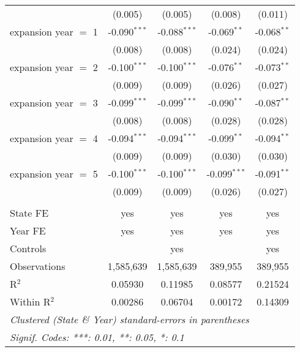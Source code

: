 \documentclass[
]{article}
\let\origtable\table
\let\endorigtable\endtable
\renewenvironment{table}[1][ht]{
      \expandafter\origtable\expandafter[H]
    }{
      \endorigtable
    }
\begin{document}
\begin{table}[htbp]
\begin{tabular}{lcccc}
                            & (0.005)        & (0.005)                & (0.008)        & (0.011)\\   
      expansion year $=$ 1  & -0.090$^{***}$ & -0.088$^{***}$         & -0.069$^{**}$  & -0.068$^{**}$\\   
                            & (0.008)        & (0.008)                & (0.024)        & (0.024)\\   
      expansion year $=$ 2  & -0.100$^{***}$ & -0.100$^{***}$         & -0.076$^{**}$  & -0.073$^{**}$\\   
                            & (0.009)        & (0.009)                & (0.026)        & (0.027)\\   
      expansion year $=$ 3  & -0.099$^{***}$ & -0.099$^{***}$         & -0.090$^{**}$  & -0.087$^{**}$\\   
                            & (0.008)        & (0.008)                & (0.028)        & (0.028)\\   
      expansion year $=$ 4  & -0.094$^{***}$ & -0.094$^{***}$         & -0.099$^{**}$  & -0.094$^{**}$\\   
                            & (0.009)        & (0.009)                & (0.030)        & (0.030)\\   
      expansion year $=$ 5  & -0.100$^{***}$ & -0.100$^{***}$         & -0.099$^{***}$ & -0.091$^{**}$\\   
                            & (0.009)        & (0.009)                & (0.026)        & (0.027)\\   
       \\
      State FE              & yes            & yes                    & yes            & yes\\  
      Year FE               & yes            & yes                    & yes            & yes\\  
      Controls              &                & yes                    &                & yes\\  
      Observations          & 1,585,639      & 1,585,639              & 389,955        & 389,955\\  
      R$^2$                 & 0.05930        & 0.11985                & 0.08577        & 0.21524\\  
      Within R$^2$          & 0.00286        & 0.06704                & 0.00172        & 0.14309\\  
      \midrule \midrule
      \multicolumn{5}{l}{\emph{Clustered (State \& Year) standard-errors in parentheses}}\\
      \multicolumn{5}{l}{\emph{Signif. Codes: ***: 0.01, **: 0.05, *: 0.1}}\\
   \end{tabular}
\end{table}
\end{document}
